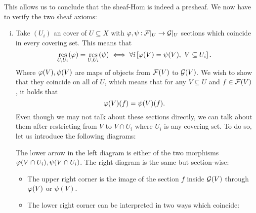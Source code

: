 \documentclass[12pt]{memoir}
\begin{document}
\begin{ptcbr}
\begin{enumerate}[i)]
    \end{enumerate}
    This allows us to conclude that the sheaf-Hom is indeed a presheaf. We now have to verify the two sheaf axioms:
    \begin{enumerate}[i)]
        \itemsep=-0.4em
        \item Take $(U_i)$ an cover of $U\subseteq X$ with $\varphi,\psi\mathbin{:}\mathcal{F}|_U\to\mathcal{G}|_U$ sections which coincide in every covering set. This means that 
        $$\operatorname*{res}_{U,U_i}(\varphi)=\operatorname*{res}_{U,U_i}(\psi)\iff\forall i\left\lbrack\varphi(V)=\psi(V),\ V\subseteq U_i\right\rbrack.$$
        Where $\varphi(V),\psi(V)$ are maps of objects from $\mathcal{F}(V)$ to $\mathcal{G}(V)$. We wish to show that they coincide on all of $U$, which means that for any $V\subseteq U$ and $f\in\mathcal{F}(V)$, it holds that
        $$\varphi(V)(f)=\psi(V)(f).$$
        Even though we may not talk about these sections directly, we can talk about them after restricting from $V$ to $V\cap U_i$ where $U_i$ is any covering set. To do so, let us introduce the following diagrams:
        \begin{center}
        \end{center}
The lower arrow in the left diagram is either of the two morphisms $\varphi(V\cap U_i),\psi(V\cap U_i)$. The right diagram is the same but section-wise:
\begin{itemize}
    \itemsep=-0.4em
    \item The upper right corner is the image of the section $f$ inside $\mathcal{G}(V)$ through $\varphi(V)$ or $\psi(V)$.
    \item The lower right corner can be interpreted in two ways which coincide:

\end{itemize}
\end{enumerate}
\end{ptcbr}
\end{document}
